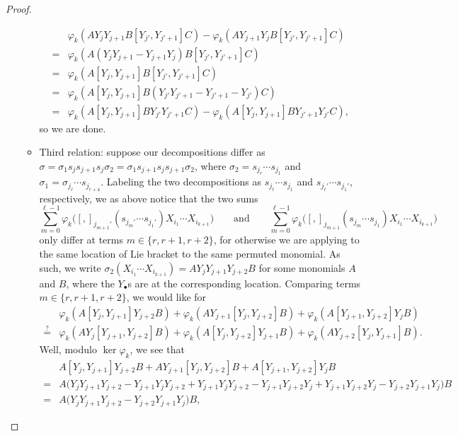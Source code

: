 \documentclass[../notes.tex]{subfiles}
\begin{document}
\begin{proof}
\begin{itemize}
\begin{itemize}
			\begin{align*}
				& \varphi_k(AY_{j}Y_{j+1}B[Y_{j'},Y_{j'+1}]C)-\varphi_k(AY_{j+1}Y_{j}B[Y_{j'},Y_{j'+1}]C) \\
				={}& \varphi_k(A(Y_{j}Y_{j+1}-Y_{j+1}Y_j)B[Y_{j'},Y_{j'+1}]C) \\
				={}& \varphi_k(A[Y_{j},Y_{j+1}]B[Y_{j'},Y_{j'+1}]C) \\
				={}& \varphi_k(A[Y_{j},Y_{j+1}]B(Y_{j'}Y_{j'+1}-Y_{j'+1}-Y_{j'})C) \\
				={}& \varphi_k(A[Y_{j},Y_{j+1}]BY_{j'}Y_{j'+1}C)-\varphi_k(A[Y_{j},Y_{j+1}]BY_{j'+1}Y_{j'}C),
			\end{align*}
			so we are done.
			
			\item Third relation: suppose our decompositions differ as $\sigma=\sigma_1s_js_{j+1}s_j\sigma_2=\sigma_1s_{j+1}s_js_{j+1}\sigma_2$, where $\sigma_2=s_{j_r}\cdots s_{j_1}$ and $\sigma_1=\sigma_{j_\ell}\cdots s_{j_{r+4}}$. Labeling the two decompositions as $s_{j_\ell}\cdots s_{j_1}$ and $s_{j_\ell'}\cdots s_{j_1'}$, respectively, we as above notice that the two sums
			\[\sum_{m=0}^{\ell-1}\varphi_k\big([,]_{j_{m+1}'}(s_{j_m'}\cdots s_{j_1'})X_{i_1}\cdots X_{i_{k+1}}\big)\qquad\text{and}\qquad\sum_{m=0}^{\ell-1}\varphi_k\big([,]_{j_{m+1}}(s_{j_m}\cdots s_{j_1})X_{i_1}\cdots X_{i_{k+1}}\big)\]
			only differ at terms $m\in\{r,r+1,r+2\}$, for otherwise we are applying to the same location of Lie bracket to the same permuted monomial.
			As such, we write $\sigma_2(X_{i_1}\cdots X_{i_{k+1}})=AY_jY_{j+1}Y_{j+2}B$ for some monomials $A$ and $B$, where the $Y_\bullet$s are at the corresponding location.
			Comparing terms $m\in\{r,r+1,r+2\}$, we would like for
			\begin{align*}
				&\varphi_k(A[Y_j,Y_{j+1}]Y_{j+2}B)+\varphi_k(AY_{j+1}[Y_j,Y_{j+2}]B)+\varphi_k(A[Y_{j+1},Y_{j+2}]Y_{j}B) \\
				\stackrel?={}& \varphi_k(AY_j[Y_{j+1},Y_{j+2}]B)+\varphi_k(A[Y_j,Y_{j+2}]Y_{j+1}B)+\varphi_k(AY_{j+2}[Y_{j},Y_{j+1}]B).
			\end{align*}
			Well, modulo $\ker\varphi_k$, we see that
			\begin{align*}
				& A[Y_j,Y_{j+1}]Y_{j+2}B + AY_{j+1}[Y_j,Y_{j+2}]B + A[Y_{j+1},Y_{j+2}]Y_{j}B \\
				={}& A\big(Y_jY_{j+1}Y_{j+2}-Y_{j+1}Y_jY_{j+2} + Y_{j+1}Y_jY_{j+2} - Y_{j+1}Y_{j+2}Y_j + Y_{j+1}Y_{j+2}Y_j - Y_{j+2}Y_{j+1}Y_j\big)B \\
				={}& A\big(Y_jY_{j+1}Y_{j+2} - Y_{j+2}Y_{j+1}Y_j\big)B,

\end{align*}
\end{itemize}
\end{itemize}
\end{proof}
\end{document}
